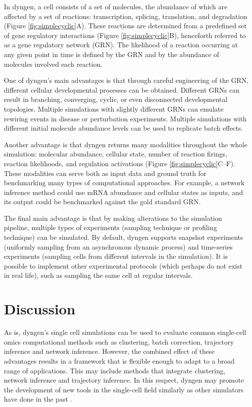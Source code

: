 In dyngen, a cell consists of a set of molecules, the abundance of which are affected by a set of reactions: transcription, splicing, translation, and degradation (Figure \ref{fig:simplecyclic}A). These reactions are determined from a predefined set of gene regulatory interactions (Figure \ref{fig:simplecyclic}B), henceforth referred to as a gene regulatory network (GRN). The likelihood of a reaction occurring at any given point in time is defined by the GRN and by the abundance of molecules involved each reaction.

One of dyngen's main advantages is that through careful engineering of the GRN, different cellular developmental processes can be obtained. Different GRNs can result in branching, converging, cyclic, or even disconnected developmental topologies. Multiple simulations with slightly different GRNs can emulate rewiring events in disease or perturbation experiments. %
Multiple simulations with different initial molecule abundance levels can be used to replicate batch effects. 

Another advantage is that dyngen returns many modalities throughout the whole simulation: molecular abundance, cellular state, number of reaction firings, reaction likelihoods, and regulation activations (Figure \ref{fig:simplecyclic}C--F). These modalities can serve both as input data and ground truth for benchmarking many types of computational approaches. For example, a network inference method could use mRNA abundance and cellular states as inputs, and its output could be benchmarked against the gold standard GRN.

The final main advantage is that by making alterations to the simulation pipeline, multiple types of experiments (sampling technique or profiling technique) can be simulated. By default, dyngen supports snapshot experiments (uniformly sampling from an asynchronous dynamic process) and time-series experiments (sampling cells from different intervals in the simulation). 
It is possible to implement other experimental protocols (which perhaps do not exist in real life), such as sampling the same cell at regular intervals. 


\section{Discussion}
As is, dyngen's single cell simulations can be used to evaluate common single-cell omics computational methods such as clustering, batch correction, trajectory inference and network inference.
However, the combined effect of these advantages results in a framework that is flexible enough to adapt to a broad range of applications. This may include methods that integrate clustering, network inference and trajectory inference. In this respect, dyngen may promote the development of new tools in the single-cell field similarly as other simulators have done in the past \cite{schaffter_genenetweaversilicobenchmark_2011,ewing_combiningtumorgenome_2015}.

